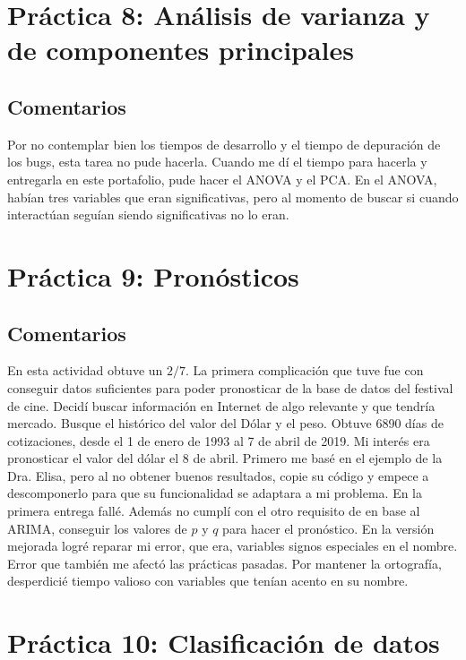 \documentclass[12pt, letter]{report}
\begin{document}
\chapter*{Práctica 8: Análisis de varianza y de componentes principales}

\section*{Comentarios}
Por no contemplar bien los tiempos de desarrollo y el tiempo de depuración de los bugs, esta tarea no pude hacerla. Cuando me dí el tiempo para hacerla y entregarla en este portafolio, pude hacer el ANOVA y el PCA. En el ANOVA, habían tres variables que eran significativas, pero al momento de buscar si cuando interactúan seguían siendo significativas no lo eran.


\chapter*{Práctica 9: Pronósticos}

\section*{Comentarios}
En esta actividad obtuve un $2/7$. La primera complicación que tuve fue con conseguir datos suficientes para poder pronosticar de la base de datos del festival de cine. Decidí buscar información en Internet de algo relevante y que tendría mercado. Busque el histórico del valor del Dólar y el peso. Obtuve 6890 días de cotizaciones, desde el 1 de enero de 1993 al 7 de abril de 2019. Mi interés era pronosticar el valor del dólar el 8 de abril. Primero me basé en el ejemplo de la Dra. Elisa, pero al no obtener buenos resultados, copie su código y empece a descomponerlo para que su funcionalidad se adaptara a mi problema. En la primera entrega fallé. Además no cumplí con el otro requisito de en base al ARIMA, conseguir los valores de $p$ y $q$ para hacer el pronóstico. En la versión mejorada logré reparar mi error, que era, variables signos especiales en el nombre. Error que también me afectó las prácticas pasadas. Por mantener la ortografía, desperdicié tiempo valioso con variables que tenían acento en su nombre.


\chapter*{Práctica 10: Clasificación de datos}

\end{document}
